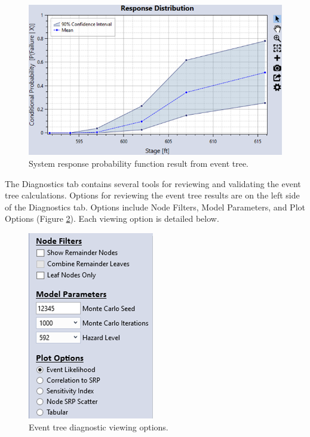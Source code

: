 \documentclass[
]{book}
\begin{document}
\begin{figure}

{\centering \includegraphics{images/figure92} 

}

\caption{System response probability function result from event tree.}\label{fig:figure-92}
\end{figure}

The Diagnostics tab contains several tools for reviewing and validating the event tree calculations. Options for reviewing the event tree results are on the left side of the Diagnostics tab. Options include Node Filters, Model Parameters, and Plot Options (Figure \ref{fig:figure-93}). Each viewing option is detailed below.

\begin{figure}

{\centering \includegraphics{images/figure93} 

}

\caption{Event tree diagnostic viewing options.}\label{fig:figure-93}
\end{figure}
\end{document}
